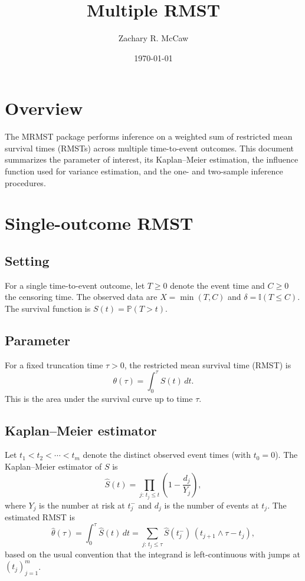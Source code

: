 \documentclass[11pt]{article}
\title{Multiple RMST}
\author{Zachary R. McCaw}
\date{\today}
\begin{document}
\maketitle

\section{Overview}

The MRMST package performs inference on a weighted sum of restricted mean survival times (RMSTs) across multiple time-to-event outcomes. This document summarizes the parameter of interest, its Kaplan--Meier estimation, the influence function used for variance estimation, and the one- and two-sample inference procedures.

\section{Single-outcome RMST}

\subsection{Setting}

For a single time-to-event outcome, let $T \geq 0$ denote the event time and $C \geq 0$ the censoring time. The observed data are $X = \min(T, C)$ and $\delta = \mathbb{I}(T \leq C)$. The survival function is $S(t) = \mathbb{P}(T > t)$.

\subsection{Parameter}

For a fixed truncation time $\tau > 0$, the restricted mean survival time (RMST) is
\begin{equation}
  \theta(\tau) = \int_0^{\tau} S(t)\,dt.
\end{equation}
This is the area under the survival curve up to time $\tau$. 

\subsection{Kaplan--Meier estimator}

Let $t_1 < t_2 < \cdots < t_m$ denote the distinct observed event times (with $t_0 = 0$). The Kaplan--Meier estimator of $S$ is
\begin{equation}
  \widehat{S}(t) = \prod_{j:\, t_j \leq t} \left( 1 - \frac{d_j}{Y_j} \right),
\end{equation}
where $Y_j$ is the number at risk at $t_j^-$ and $d_j$ is the number of events at $t_j$. The estimated RMST is
\begin{equation}
  \widehat{\theta}(\tau) = \int_0^{\tau} \widehat{S}(t)\,dt = \sum_{j:\, t_j \leq \tau} \widehat{S}(t_j^-)\,(t_{j+1} \wedge \tau - t_j),
\end{equation}
based on the usual convention that the integrand is left-continuous with jumps at $(t_{j})_{j=1}^{m}$. 
\end{document}
